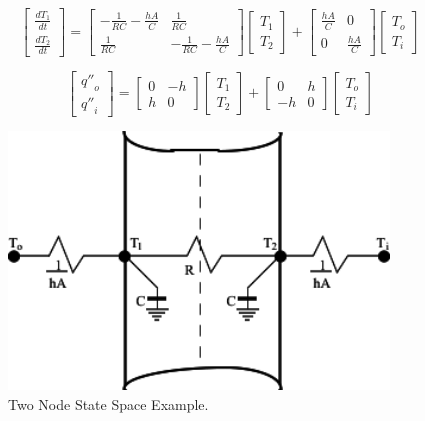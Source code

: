 \begin{equation}
\left[\begin{array}{c}\frac{dT_1}{dt} \\ \frac{dT_2}{dt}\end{array}\right] = 
     \left[\begin{array}{cc}-\frac{1}{RC}-\frac{hA}{C} & \frac{1}{RC} \\ \frac{1}{RC} & -\frac{1}{RC}-\frac{hA}{C}\end{array}\right]\left[\begin{array}{c}T_1 \\ T_2\end{array}\right] + 
     \left[\begin{array}{cc}\frac{hA}{C} & 0 \\ 0 & \frac{hA}{C}\end{array}\right]\left[\begin{array}{c}T_o \\ T_i\end{array}\right]
\end{equation}

\begin{equation}
\left[\begin{array}{c}{q''}_o \\ {q''}_i\end{array}\right] = 
    \left[\begin{array}{cc}0 & -h \\ h & 0\end{array}\right] \left[\begin{array}{c}T_1 \\ T_2\end{array}\right] +
    \left[\begin{array}{cc}0 & h \\ -h & 0\end{array}\right] \left[\begin{array}{c}T_o \\ T_i\end{array}\right]
\end{equation}

\begin{figure}[hbtp] %
\centering
\includegraphics[width=0.9\textwidth, height=0.9\textheight, keepaspectratio=true]{media/image168.svg.png}
\caption{Two Node State Space Example. \protect \label{fig:two-node-state-space-example.}}
\end{figure}

